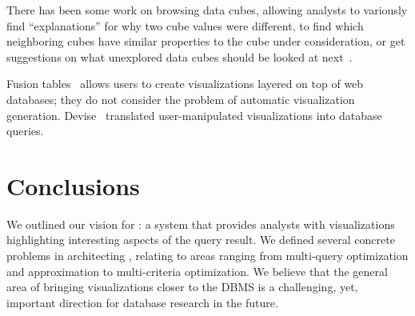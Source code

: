 \documentclass{sig-alternate}
\begin{document}
 There has been some work on browsing data cubes, allowing analysts to variously find ``explanations'' for why two cube values were different, to find which neighboring cubes have similar properties to the cube under consideration, or get suggestions on what unexplored data cubes should be looked at next~\cite{DBLP:conf/vldb/Sarawagi99, DBLP:conf/vldb/SatheS01, DBLP:conf/vldb/Sarawagi00}. 


 Fusion tables~\cite{DBLP:conf/sigmod/GonzalezHJLMSSG10} allows users to create visualizations layered on top of web databases; they do not consider the problem of automatic visualization generation. Devise~\cite{DBLP:conf/sigmod/LivnyRBCDLMW97} translated user-manipulated visualizations into database queries.  


\vspace{-3pt}
\section{Conclusions}\label{sec:conclusions}
\noindent We outlined our vision for \SeeDB: a system that provides analysts with visualizations highlighting interesting aspects of the query result. We defined several concrete problems in architecting \SeeDB, relating to areas ranging from multi-query optimization and approximation to multi-criteria optimization. We believe that the general area of bringing visualizations closer to the DBMS is a challenging, yet, important direction for database research in the future.


\vspace{-3pt}
{\scriptsize


}
\end{document}
